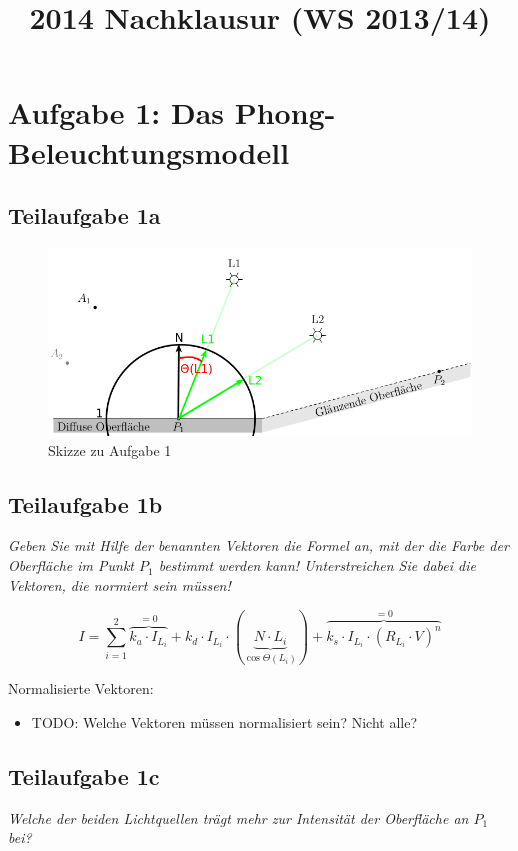 \documentclass[a4paper]{scrartcl}
\begin{document}
\title{2014 Nachklausur (WS 2013/14)}

\setcounter{section}{1}
\section*{Aufgabe 1: Das Phong-Beleuchtungsmodell}
\subsection*{Teilaufgabe 1a}
\begin{figure}[h]
    \centering
    \includegraphics*[width=0.8\linewidth, keepaspectratio]{1a.png}
    \caption{Skizze zu Aufgabe 1}
    \label{fig:1a}
\end{figure}

\subsection*{Teilaufgabe 1b}
\textit{Geben Sie mit Hilfe der benannten Vektoren die Formel an, mit der die
Farbe der Oberfläche im Punkt $P_1$ bestimmt werden kann! Unterstreichen Sie
dabei die Vektoren, die normiert sein müssen!}

\[I = \sum_{i=1}^2 \overbrace{k_a \cdot I_{L_i}}^{=0} + k_d \cdot I_{L_i} \cdot (\underbrace{N \cdot L_{i}}_{\cos \Theta({L_i})}) + \overbrace{k_s \cdot I_{L_i} \cdot (R_{L_i} \cdot V)^n}^{=0}\]

Normalisierte Vektoren:

\begin{itemize}
    \item TODO: Welche Vektoren müssen normalisiert sein? Nicht alle?
\end{itemize}


\subsection*{Teilaufgabe 1c}
\textit{Welche der beiden Lichtquellen trägt mehr zur Intensität der Oberfläche
an $P_1$ bei?}
\end{document}

